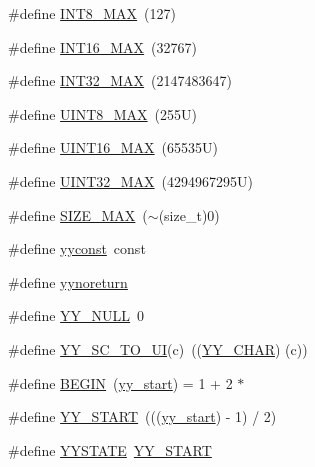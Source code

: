 \begin{DoxyCompactItemize}
\item 
\#define \hyperlink{_genesys_09_09-scanner_8cpp_aaf7f29f45f1a513b4748a4e5014ddf6a}{I\-N\-T8\-\_\-\-M\-A\-X}~(127)
\item 
\#define \hyperlink{_genesys_09_09-scanner_8cpp_ac58f2c111cc9989c86db2a7dc4fd84ca}{I\-N\-T16\-\_\-\-M\-A\-X}~(32767)
\item 
\#define \hyperlink{_genesys_09_09-scanner_8cpp_a181807730d4a375f848ba139813ce04f}{I\-N\-T32\-\_\-\-M\-A\-X}~(2147483647)
\item 
\#define \hyperlink{_genesys_09_09-scanner_8cpp_aeb4e270a084ee26fe73e799861bd0252}{U\-I\-N\-T8\-\_\-\-M\-A\-X}~(255\-U)
\item 
\#define \hyperlink{_genesys_09_09-scanner_8cpp_a3ea490c9b3617d4479bd80ef93cd5602}{U\-I\-N\-T16\-\_\-\-M\-A\-X}~(65535\-U)
\item 
\#define \hyperlink{_genesys_09_09-scanner_8cpp_ab5eb23180f7cc12b7d6c04a8ec067fdd}{U\-I\-N\-T32\-\_\-\-M\-A\-X}~(4294967295\-U)
\item 
\#define \hyperlink{_genesys_09_09-scanner_8cpp_a3c75bb398badb69c7577b21486f9963f}{S\-I\-Z\-E\-\_\-\-M\-A\-X}~($\sim$(size\-\_\-t)0)
\item 
\#define \hyperlink{_genesys_09_09-scanner_8cpp_aa2f1a918be586b44bf08126bde2d7cc9}{yyconst}~const
\item 
\#define \hyperlink{_genesys_09_09-scanner_8cpp_a452d0647f1848fea42589793f3e2d1f4}{yynoreturn}
\item 
\#define \hyperlink{_genesys_09_09-scanner_8cpp_a8e0bcf8f8a5b613ea583347f8bc31cbf}{Y\-Y\-\_\-\-N\-U\-L\-L}~0
\item 
\#define \hyperlink{_genesys_09_09-scanner_8cpp_af1185350b7a92cf8aa5324c68850c8a6}{Y\-Y\-\_\-\-S\-C\-\_\-\-T\-O\-\_\-\-U\-I}(c)~((\hyperlink{_genesys_09_09-scanner_8cpp_acc1e625a829554ffed5e4307d4a5f6b7}{Y\-Y\-\_\-\-C\-H\-A\-R}) (c))
\item 
\#define \hyperlink{_genesys_09_09-scanner_8cpp_ab766bbbee08d04b67e3fe599d6900873}{B\-E\-G\-I\-N}~(\hyperlink{_genesys_09_09-scanner_8cpp_a2e1e1d9ee4610a6679d49ed8194b00af}{yy\-\_\-start}) = 1 + 2 $\ast$
\item 
\#define \hyperlink{_genesys_09_09-scanner_8cpp_a8e14785f9eab7a997d659b25af9584c5}{Y\-Y\-\_\-\-S\-T\-A\-R\-T}~(((\hyperlink{_genesys_09_09-scanner_8cpp_a2e1e1d9ee4610a6679d49ed8194b00af}{yy\-\_\-start}) -\/ 1) / 2)
\item 
\#define \hyperlink{_genesys_09_09-scanner_8cpp_a32b5b960944f946b192d54f672569cd9}{Y\-Y\-S\-T\-A\-T\-E}~\hyperlink{_genesys_09_09-scanner_8cpp_a8e14785f9eab7a997d659b25af9584c5}{Y\-Y\-\_\-\-S\-T\-A\-R\-T}

\end{DoxyCompactItemize}
